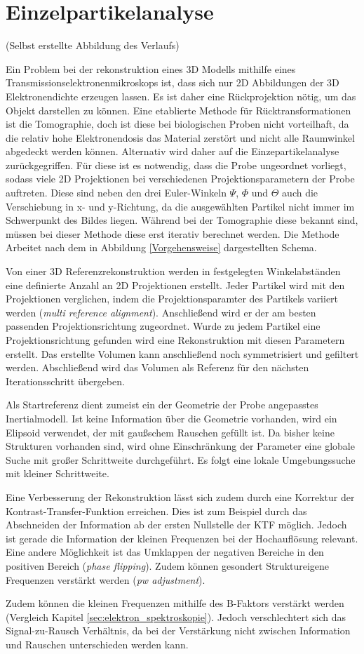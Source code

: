 \section{Einzelpartikelanalyse}
\label{einzelpartikelanalyse}
(Selbst erstellte Abbildung des Verlaufs)

Ein Problem bei der rekonstruktion eines 3D Modells mithilfe eines Transmissionselektronenmikroskops ist, dass sich nur 2D Abbildungen der 3D Elektronendichte erzeugen lassen.
Es ist daher eine Rückprojektion nötig, um das Objekt darstellen zu können.
Eine etablierte Methode für Rücktransformationen ist die Tomographie, doch ist diese bei biologischen Proben nicht vorteilhaft, da die relativ hohe Elektronendosis das Material zerstört und nicht alle Raumwinkel abgedeckt werden können.
Alternativ wird daher auf die Einzepartikelanalyse zurückgegriffen.
Für diese ist es notwendig, dass die Probe ungeordnet vorliegt, sodass viele 2D Projektionen bei verschiedenen Projektionsparametern der Probe auftreten.
Diese sind neben den drei Euler-Winkeln $\Psi$, $\Phi$ und $\Theta$ auch die Verschiebung in x- und y-Richtung, da die ausgewählten Partikel nicht immer im Schwerpunkt des Bildes liegen.
Während bei der Tomographie diese bekannt sind, müssen bei dieser Methode diese erst iterativ berechnet werden.
Die Methode Arbeitet nach dem in Abbildung \ref{Vorgehensweise} dargestellten Schema.

Von einer 3D Referenzrekonstruktion werden in festgelegten Winkelabständen eine definierte Anzahl an 2D Projektionen erstellt.
Jeder Partikel wird mit den Projektionen verglichen, indem die Projektionsparamter des Partikels variiert werden (\textit{multi reference alignment}). 
Anschließend wird er der am besten passenden Projektionsrichtung zugeordnet.
Wurde zu jedem Partikel eine Projektionsrichtung gefunden wird eine Rekonstruktion mit diesen Parametern erstellt.
Das erstellte Volumen kann anschließend noch symmetrisiert und gefiltert werden.
Abschließend wird das Volumen als Referenz für den nächsten Iterationsschritt übergeben.

Als Startreferenz dient zumeist ein der Geometrie der Probe angepasstes Inertialmodell.
Ist keine Information über die Geometrie vorhanden, wird ein Elipsoid verwendet, der mit gaußschem Rauschen gefüllt ist.
Da bisher keine Strukturen vorhanden sind, wird ohne Einschränkung der Parameter eine globale Suche mit großer Schrittweite durchgeführt.
Es folgt eine lokale Umgebungssuche mit kleiner Schrittweite.

Eine Verbesserung der Rekonstruktion lässt sich zudem durch eine Korrektur der Kontrast-Transfer-Funktion erreichen.
Dies ist zum Beispiel durch das Abschneiden der Information ab der ersten Nullstelle der KTF möglich. 
Jedoch ist gerade die Information der kleinen Frequenzen bei der Hochauflösung relevant.
Eine andere Möglichkeit ist das Umklappen der negativen Bereiche in den positiven Bereich (\textit{phase flipping}).
Zudem können gesondert Struktureigene Frequenzen verstärkt werden (\textit{pw adjustment}).

Zudem können die kleinen Frequenzen mithilfe des B-Faktors verstärkt werden (Vergleich Kapitel \ref{sec:elektron_spektroskopie}). 
Jedoch verschlechtert sich das Signal-zu-Rausch Verhältnis, da bei der Verstärkung nicht zwischen Information und Rauschen unterschieden werden kann.

\FloatBarrier